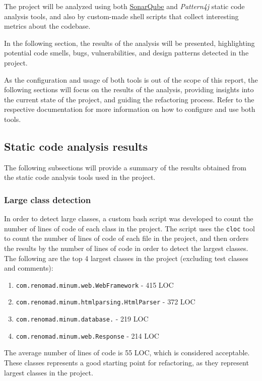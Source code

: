 The project will be analyzed using both \href{https://www.sonarsource.com/}{SonarQube} and \textit{Pattern4j} static code analysis tools, and also by custom-made shell scripts that collect interesting metrics about the codebase.

In the following section, the results of the analysis will be presented, highlighting potential code smells, bugs, vulnerabilities, and design patterns detected in the project.

As the configuration and usage of both tools is out of the scope of this report, the following sections will focus on the results of the analysis, providing insights into the current state of the project, and guiding the refactoring process. Refer to the respective documentation for more information on how to configure and use both tools.

\subsection{Static code analysis results}

The following subsections will provide a summary of the results obtained from the static code analysis tools used in the project.

\subsubsection{Large class detection}

In order to detect large classes, a custom bash script was developed to count the number of lines of code of each class in the project. The script uses the \texttt{cloc} tool to count the number of lines of code of each file in the project, and then orders the results by the number of lines of code in order to detect the largest classes. The following are the top 4 largest classes in the project (excluding test classes and comments):

\begin{enumerate}
	\item \texttt{com.renomad.minum.web.WebFramework} - 415 LOC
	\item \texttt{com.renomad.minum.htmlparsing.HtmlParser} - 372 LOC
	\item \texttt{com.renomad.minum.database.} - 219 LOC
	\item \texttt{com.renomad.minum.web.Response} - 214 LOC
\end{enumerate}

\noindent The average number of lines of code is 55 LOC, which is considered acceptable. These classes represents a good starting point for refactoring, as they represent largest classes in the project.

